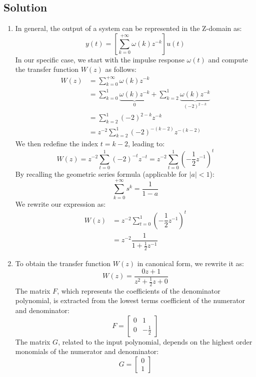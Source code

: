 \subsection*{Solution}
\begin{enumerate}
    \item In general, the output of a system can be represented in the Z-domain as:
        \[y(t)=\left[\sum_{k=0}^{+\infty}\omega(k)z^{-k}\right]u(t)\]
        In our specific case, we start with the impulse response $\omega(t)$ and compute the transfer function $W(z)$ as follows:
        \begin{align*}
            W(z)    &=\sum_{k=0}^{+\infty}\omega(k)z^{-k} \\
                    &=\sum_{k=0}^{1}\underbrace{\omega(k)z^{-k}}_{0}  + \sum_{k=2}^{1}\underbrace{\omega(k)z^{-k}}_{(-2)^{2-k}} \\
                    &=\sum_{k=2}^{1}(-2)^{2-k}z^{-k} \\
                    &=z^{-2}\sum_{k=2}^{1}(-2)^{-(k-2)}z^{-(k-2)}
        \end{align*}
        We then redefine the index $t=k-2$,  leading to:
        \[W(z)=z^{-2}\sum_{t=0}^{1}(-2)^{-t}z^{-t}=z^{-2}\sum_{t=0}^{1}\left(-\dfrac{1}{2}z^{-1}\right)^{t}\]
        By recalling the geometric series formula (applicable for $\left\lvert a \right\rvert<1$): 
        \[\sum_{k=0}^{+\infty}s^{k}=\dfrac{1}{1-a}\]
        We rewrite our expression as:
        \begin{align*}
            W(z)    &=z^{-2}\sum_{t=0}^{1}\left(-\dfrac{1}{2}z^{-1}\right)^{t} \\
                    &=z^{-2}\dfrac{1}{1+\frac{1}{2}z^{-1}}
        \end{align*}
    \item To obtain the transfer function $W(z)$ in canonical form, we rewrite it as:
        \[W(z)=\dfrac{0z+1}{z^{2}+\frac{1}{2}z+0}\]
        The matrix $F$, which represents the coefficients of the denominator polynomial, is extracted from the lowest terms coefficient of the numerator and denominator:
        \[F=\begin{bmatrix} 0 & 1 \\ 0 & -\frac{1}{2} \end{bmatrix}\]
        The matrix $G$, related to the input polynomial, depends on the highest order monomials of the numerator and denominator:
        \[G=\begin{bmatrix} 0 \\ 1 \end{bmatrix}\]

\end{enumerate}
